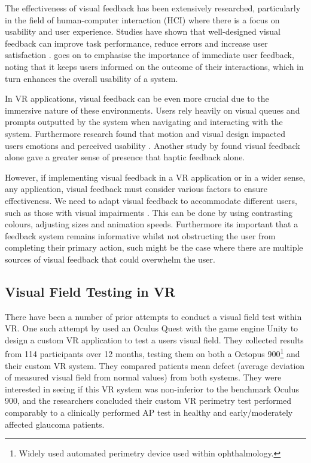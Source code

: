 \documentclass{l4proj}
\begin{document}
The effectiveness of visual feedback has been extensively researched, particularly in the field of human-computer interaction (HCI) where there is a focus on usability and user experience. Studies have shown that well-designed visual feedback can improve task performance, reduce errors and increase user satisfaction \citep{HCIMotionDesign2023}. \citet{HCIMotionDesign2023} goes on to emphasise the importance of immediate user feedback, noting that it keeps users informed on the outcome of their interactions, which in turn enhances the overall usability of a system.

In VR applications, visual feedback can be even more crucial due to the immersive nature of these environments. Users rely heavily on visual queues and prompts outputted by the system when navigating and interacting with the system. Furthermore research found that motion and visual design impacted users emotions and perceived usability \citep{Hassenzahl2008}. Another study by \citet{Gibbs2022Visual} found visual feedback alone gave a greater sense of presence that haptic feedback alone.

However, if implementing visual feedback in a VR application or in a wider sense, any application, visual feedback must consider various factors to ensure effectiveness. We need to adapt visual feedback to accommodate different users, such as those with visual impairments \citep{HCIMotionDesign2023}. This can be done by using contrasting colours, adjusting sizes and animation speeds. Furthermore its important that a feedback system remains informative whilst not obstructing the user from completing their primary action, such might be the case where there are multiple sources of visual feedback that could overwhelm the user.


\subsection{Visual Field Testing in VR}
There have been a number of prior attempts to conduct a visual field test within VR. One such attempt by \citet{Stapelfeldt2021VRGlaucoma} used an Oculus Quest with the game engine Unity to design a custom VR application to test a users visual field. They collected results from 114 participants over 12 months, testing them on both a Octopus 900\footnote{Widely used automated perimetry device used within ophthalmology.} and their custom VR system. They compared patients mean defect (average deviation of measured visual field from normal values) from both systems. They were interested in seeing if this VR system was non-inferior to the benchmark Oculus 900, and the researchers concluded their custom VR perimetry test performed comparably to a clinically performed AP test in healthy and early/moderately affected glaucoma patients.
\end{document}
